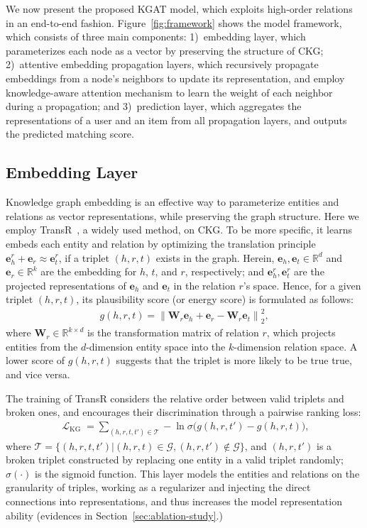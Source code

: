 \documentclass[sigconf]{acmart}
\newcommand\norm[1]{\left\lVert#1\right\rVert}
\newcommand{\Lapl}{\mathbf{\mathop{\mathcal{L}}}}
\newcommand{\Mat}[1]{\mathbf{#1}}
\newcommand{\Space}[1]{\mathbb{#1}}
\newcommand{\Set}[1]{\mathcal{#1}}
\theoremstyle{definition}
\begin{document}
We now present the proposed KGAT model, which exploits high-order relations in an end-to-end fashion.
Figure~\ref{fig:framework} shows the model framework, which consists of three main components:
1)~embedding layer, which parameterizes each node as a vector by preserving the structure of CKG;
2)~attentive embedding propagation layers, which recursively propagate embeddings from a node's neighbors to update its representation, and employ knowledge-aware attention mechanism to learn the weight of each neighbor during a propagation;
and 3)~prediction layer, which aggregates the representations of a user and an item from all propagation layers, and outputs the predicted matching score.






\subsection{Embedding Layer}\label{sec:embedding-propagation}

Knowledge graph embedding is an effective way to parameterize entities and relations as vector representations, while preserving the graph structure.
Here we employ TransR~\cite{TransR}, a widely used method, on CKG.
To be more specific, it learns embeds each entity and relation by optimizing the translation principle $\Mat{e}^{r}_{h}+\Mat{e}_{r}\approx \Mat{e}^{r}_{t}$, if a triplet $(h,r,t)$ exists in the graph.
Herein, $\Mat{e}_{h},\Mat{e}_{t}\in\Space{R}^{d}$ and $\Mat{e}_{r}\in\Space{R}^{k}$ are the embedding for $h$, $t$, and $r$, respectively;
and $\Mat{e}_{h}^{r},\Mat{e}_{t}^{r}$ are the projected representations of $\Mat{e}_{h}$ and $\Mat{e}_{t}$ in the relation $r$'s space. 
Hence, for a given triplet $(h,r,t)$, its plausibility score (or energy score) is formulated as follows:
\begin{align}\label{transr}
    g(h,r,t)=\norm{\Mat{W}_{r}\Mat{e}_{h}+\Mat{e}_{r} - \Mat{W}_{r}\Mat{e}_{t}}_{2}^{2},
\end{align}
where $\Mat{W}_{r}\in\Space{R}^{k\times d}$ is the transformation matrix of relation $r$, which projects entities from the $d$-dimension entity space into the $k$-dimension relation space.
A lower score of $g(h,r,t)$ suggests that the triplet is more likely to be true true, and vice versa.

The training of TransR considers the relative order between valid triplets and broken ones, and encourages their discrimination through a pairwise ranking loss:
\begin{align}\label{equ:kg-loss}
    \Lapl_{\text{KG}}=\sum_{(h,r,t,t')\in\Set{T}}-\ln\sigma\Big(g(h,r,t')-g(h,r,t)\Big),
\end{align}
where $\Set{T}=\{(h,r,t,t')|(h,r,t)\in\Set{G},(h,r,t')\not\in\Set{G}\}$, and $(h,r,t')$ is a broken triplet constructed by replacing one entity in a valid triplet randomly; $\sigma(\cdot)$ is the sigmoid function.
This layer models the entities and relations on the granularity of triples, working as a regularizer and injecting the direct connections into representations, and thus increases the model representation ability (evidences in Section~\ref{sec:ablation-study}.)
\end{document}
